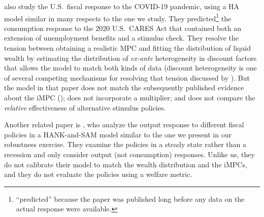\documentclass[\econtexRoot/HAFiscal]{subfiles}
\begin{document}
\cite{carroll2020modeling} also study the U.S.\ fiscal response to the COVID-19 pandemic, using a HA model similar in many respects to the one we study.  They predicted\footnote{``predicted'' because the paper was published long before any data on the actual response were available.} the consumption response to the 2020 U.S.\ CARES Act  that contained both an extension of unemployment benefits and a stimulus check.
They resolve the tension between obtaining a realistic MPC and fitting the distribution of liquid wealth by estimating the distribution of \textit{ex-ante} heterogeneity in discount factors that allows the model to match both kinds of data (discount heterogeneity is one of several competing mechanisms for resolving that tension discussed by \cite{kaplanMPC2022}).
But the model in that paper does not match the subsequently published evidence about the iMPC (\cite{fagereng_mpc_2021}); does not incorporate a multiplier; and does not compare the \textit{relative} effectiveness of alternative stimulus policies.

Another related paper is \cite{broer2025stimulus}, who analyze the output response to different fiscal policies in a HANK-and-SAM model similar to the one we present in our robustness exercise. 
They examine the policies in a steady state rather than a recession and only consider output (not consumption) responses. 
Unlike us, they do not calibrate their model to match the wealth distribution and the iMPCs, and they do not evaluate the policies using a welfare metric. 
\end{document}
